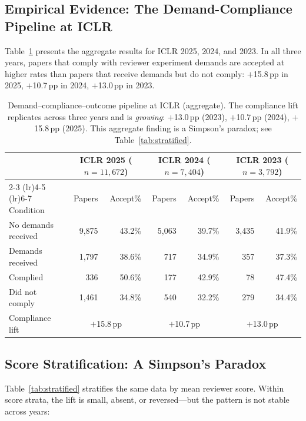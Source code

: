 \documentclass{article}
\begin{document}
\subsection{Empirical Evidence: The Demand-Compliance Pipeline at ICLR}

Table~\ref{tab:demand_compliance} presents the aggregate results for ICLR 2025, 2024, and 2023. In all three years, papers that comply with reviewer experiment demands are accepted at higher rates than papers that receive demands but do not comply: $+$15.8\,pp in 2025, $+$10.7\,pp in 2024, $+$13.0\,pp in 2023.

\begin{table}[t]
\centering
\caption{Demand--compliance--outcome pipeline at ICLR (aggregate). The compliance lift replicates across three years and is \emph{growing}: $+$13.0\,pp (2023), $+$10.7\,pp (2024), $+$15.8\,pp (2025). This aggregate finding is a Simpson's paradox; see Table~\ref{tab:stratified}.}
\label{tab:demand_compliance}
\small
\begin{tabular}{@{}lrrrrrr@{}}
\toprule
& \multicolumn{2}{c}{ICLR 2025 ($n = 11{,}672$)} & \multicolumn{2}{c}{ICLR 2024 ($n = 7{,}404$)} & \multicolumn{2}{c}{ICLR 2023 ($n = 3{,}792$)} \\
\cmidrule(lr){2-3} \cmidrule(lr){4-5} \cmidrule(lr){6-7}
Condition & Papers & Accept\% & Papers & Accept\% & Papers & Accept\% \\
\midrule
No demands received & 9{,}875 & 43.2\% & 5{,}063 & 39.7\% & 3{,}435 & 41.9\% \\
Demands received & 1{,}797 & 38.6\% & 717 & 34.9\% & 357 & 37.3\% \\
\quad Complied & 336 & 50.6\% & 177 & 42.9\% & 78 & 47.4\% \\
\quad Did not comply & 1{,}461 & 34.8\% & 540 & 32.2\% & 279 & 34.4\% \\
\midrule
Compliance lift & \multicolumn{2}{c}{$+$15.8\,pp} & \multicolumn{2}{c}{$+$10.7\,pp} & \multicolumn{2}{c}{$+$13.0\,pp} \\
\bottomrule
\end{tabular}
\end{table}

\subsection{Score Stratification: A Simpson's Paradox}

Table~\ref{tab:stratified} stratifies the same data by mean reviewer score. Within score strata, the lift is small, absent, or reversed---but the pattern is not stable across years:
\end{document}
